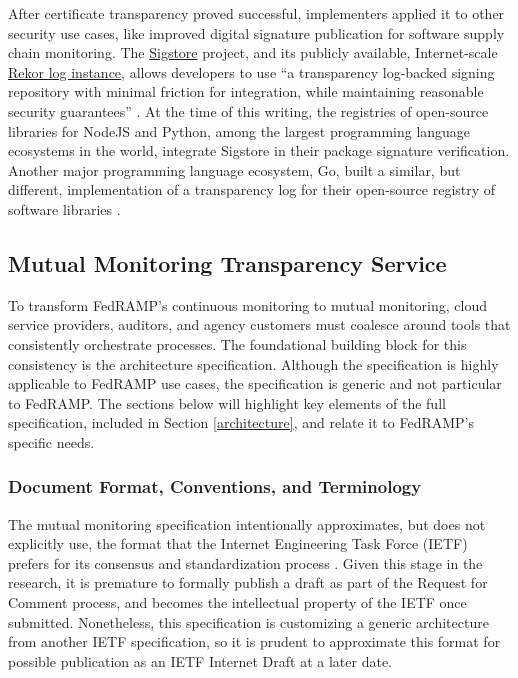 \documentclass{jdf}
\begin{document}
After certificate transparency proved successful, implementers applied it to other security use cases, like improved digital signature publication for software supply chain monitoring. The \href{https://sigstore.dev}{Sigstore} project, and its publicly available, Internet-scale \href{https://rekor.sigstore.dev/}{Rekor log instance}, allows developers to use ``a transparency log-backed signing repository with minimal friction for integration, while maintaining reasonable security guarantees'' \cite[p.~2365]{newman22}. At the time of this writing, the registries of open-source libraries for NodeJS and Python, among the largest programming language ecosystems in the world, integrate Sigstore in their package signature verification. Another major programming language ecosystem, Go, built a similar, but different, implementation of a transparency log for their open-source registry of software libraries \cite{hockman19}.

\subsection{Mutual Monitoring Transparency Service}

To transform FedRAMP's continuous monitoring to mutual monitoring, cloud service providers, auditors, and agency customers must coalesce around tools that consistently orchestrate processes. The foundational building block for this consistency is the architecture specification. Although the specification is highly applicable to FedRAMP use cases, the specification is generic and not particular to FedRAMP. The sections below will highlight key elements of the full specification, included in Section \ref{architecture}, and relate it to FedRAMP's specific needs.

\subsubsection{Document Format, Conventions, and Terminology}

The mutual monitoring specification intentionally approximates, but does not explicitly use, the format that the Internet Engineering Task Force (IETF) prefers for its consensus and standardization process \citeyear{ietf_authors_format}. Given this stage in the research, it is premature to formally publish a draft as part of the Request for Comment process, and becomes the intellectual property of the IETF once submitted. Nonetheless, this specification is customizing a generic architecture from another IETF specification, so it is prudent to approximate this format for possible publication as an IETF Internet Draft at a later date. 
\end{document}
